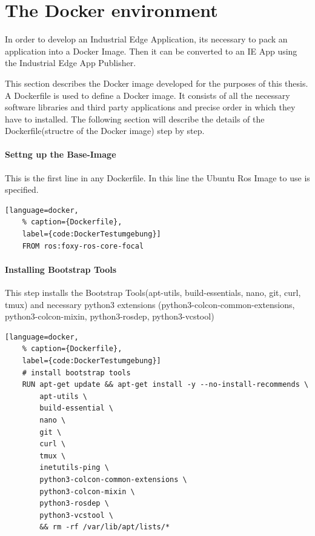 \section{The Docker environment}
\label{Implementierung:DockerEnvironment}
In order to develop an Industrial Edge Application, its necessary to pack an application into a Docker Image. Then it can be converted to an IE App using the Industrial Edge App Publisher.

This section describes the Docker image developed for the purposes of this thesis. A Dockerfile is used to define a Docker image. It consists of all the necessary software libraries and third party applications and precise order in which they have to installed. The following section will describe the details of the Dockerfile(structre of the Docker image) step by step.

\paragraph{Settng up the Base-Image} This is the first line in any Dockerfile. In this line the Ubuntu Ros Image to use is specified.
\begin{lstlisting}[language=docker,
	% caption={Dockerfile}, 
	label={code:DockerTestumgebung}]
	FROM ros:foxy-ros-core-focal
\end{lstlisting}


\paragraph{Installing Bootstrap Tools} This step installs the Bootstrap Tools(apt-utils, build-essentials, nano, git, curl, tmux) and necessary python3 extensions (python3-colcon-common-extensions, python3-colcon-mixin, python3-rosdep, python3-vcstool)

\begin{lstlisting}[language=docker,
	% caption={Dockerfile}, 
	label={code:DockerTestumgebung}]
	# install bootstrap tools
	RUN apt-get update && apt-get install -y --no-install-recommends \
		apt-utils \
		build-essential \
		nano \
		git \
		curl \
		tmux \
		inetutils-ping \
		python3-colcon-common-extensions \
		python3-colcon-mixin \
		python3-rosdep \
		python3-vcstool \
		&& rm -rf /var/lib/apt/lists/*

\end{lstlisting}

